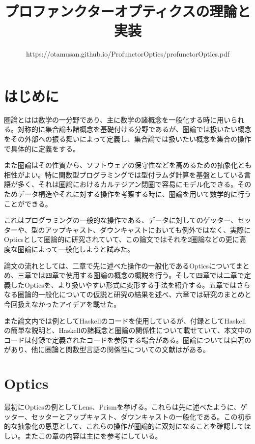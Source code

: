 \documentclass[uplatex,dvipdfmx]{jsarticle}
\begin{document}
  \title{プロファンクターオプティクスの理論と実装}
  \author{https://otamusan.github.io/ProfunctorOptics/profunctorOptics.pdf}
  \maketitle

	\tableofcontents
  \pagebreak
  \section{はじめに}
  圏論とはは数学の一分野であり、主に数学の諸概念を一般化する時に用いられる。対称的に集合論も諸概念を基礎付ける分野であるが、圏論では扱いたい概念をその外部への振る舞いによって定義し、集合論では扱いたい概念を集合の操作で具体的に定義をする。

  また圏論はその性質から、ソフトウェアの保守性などを高めるための抽象化とも相性がよい。特に関数型プログラミングでは型付ラムダ計算を基盤としている言語が多く、それは圏論におけるカルテジアン閉圏で容易にモデル化できる。そのためデータ構造やそれに対する操作を考察する時に、圏論を用いて数学的に行うことができる。

  これはプログラミングの一般的な操作である、データに対してのゲッター、セッターや、型のアップキャスト、ダウンキャストにおいても例外ではなく、実際にOpticsとして圏論的に研究されていて、この論文ではそれを2圏論などの更に高度な圏論によって一般化しようと試みた。

  論文の流れとしては、二章で先に述べた操作の一般化であるOpticsについてまとめ、三章では四章で使用する圏論の概念の概説を行う。そして四章では二章で定義したOpticsを、より扱いやすい形式に変形する手法を紹介する。五章ではさらなる圏論的一般化についての仮説と研究の結果を述べ、六章では研究のまとめと今回扱えなかったアイデアを載せた。

  また論文内では例としてHaskellのコードを使用しているが、付録としてHaskellの簡単な説明と、Haskellの諸概念と圏論の関係性について載せていて、本文中のコードは付録で定義されたコードを参照する場合がある。圏論については自著の\cite{cti}があり、他に圏論と関数型言語の関係性についての文献は\cite{dao_of_fp}がある。
  \section{Optics}
  最初にOpticsの例としてLens、Prismを挙げる。これらは先に述べたように、ゲッター、セッターとアップキャスト、ダウンキャストの一般化である。この初歩的な抽象化の恩恵として、これらの操作が圏論的に双対になることを確認してほしい。またこの章の内容は主に\cite{categories_of_optics}を参考にしている。
\end{document}
